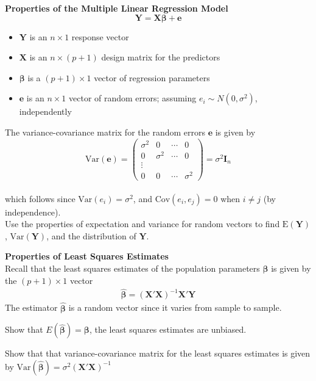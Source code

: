 \documentclass[11pt, fleqn]{article}\usepackage[]{graphicx}\usepackage[]{color}
\newcommand{\Var}{\textrm{Var}}
\newcommand{\Cov}{\textrm{Cov}}
\newcommand{\E}{\textrm{E}}
\begin{document}
\textbf{Properties of the Multiple Linear Regression Model}\\
$$\bm{Y} = \bm{X}\bm{\beta} + \bm{e}$$
\begin{itemize}
\item $\bm{Y}$ is an $n \times 1$ response vector
\item $\bm{X}$ is an $n \times (p+1)$ design matrix for the predictors
\item $\bm{\beta}$  is a $(p+1) \times 1$ vector of regression parameters
\item $\bm{e}$ is an $n \times 1$ vector of random errors; assuming $e_i \sim N(0, \sigma^2)$, independently
\end{itemize}
The variance-covariance matrix for the random errors $\bm{e}$ is given by\\
\[
\Var(\bm{e}) = 
\begin{pmatrix}
\sigma^2 & 0 & \cdots & 0\\
0 & \sigma^2 & \cdots & 0\\
\vdots\\
0 & 0 & \cdots & \sigma^2
\end{pmatrix}
= \sigma^2 \bm{I}_n
\]\\
which follows since $\Var(e_i) = \sigma^2$, and $\Cov(e_i, e_j) = 0$ when $i \neq j$ (by independence).\\

Use the properties of expectation and variance for random vectors to find $\E(\bm{Y})$, $\Var(\bm{Y})$, and the distribution of $\bm{Y}$.\\
\vspace{5cm}

\textbf{Properties of Least Squares Estimates}\\
Recall that the least squares estimates of the population parameters $\bm{\beta}$ is given by the $(p+1) \times 1$ vector
\begin{align*}
\bm{\hat{\beta}} = (\bm{X'X})^{-1} \bm{X'Y}
\end{align*}
The estimator $\bm{\hat{\beta}}$ is a random vector since it varies from sample to sample.\\
\clearpage

Show that $E(\bm{\hat{\beta}}) = \bm{\beta}$, the least squares estimates are unbiased.\\
\vspace{5cm}

Show that that variance-covariance matrix for the least squares estimates is given by $\Var(\bm{\hat{\beta}}) = \sigma^2 (\bm{X'X})^{-1}$\\
\vspace{7cm}
\end{document}
